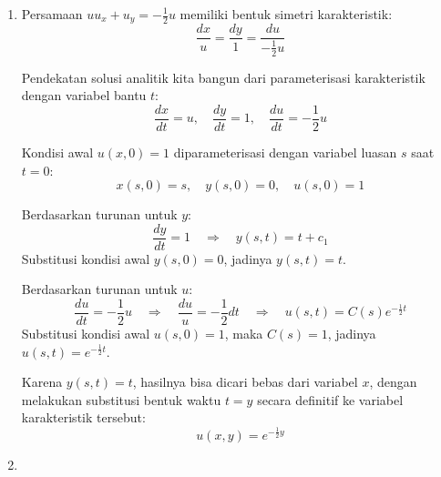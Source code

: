 \documentclass{article}
\theoremstyle{definition}
\begin{document}
\begin{enumerate}
        Dari persamaan \(\frac{dx}{y} = \frac{dy}{x}\), diperoleh:
        \[
          x\,dx - y\,dy = 0
          \quad \Rightarrow \quad
          \frac{1}{2}x^2 - \frac{1}{2}y^2 = c_1
          \quad \Rightarrow \quad
          x^2 - y^2 = C_1
        \]

        Dari persamaan \(\frac{dx}{y} = \frac{du}{xy}\), diperoleh:
        \[
          x\,dx = du
          \quad \Rightarrow \quad
          \int x\,dx = \int du
          \quad \Rightarrow \quad
          u - \frac{1}{2}x^2 = C_2
        \]

        Berdasarkan metode Lagrange, solusi umum dinyatakan dalam bentuk persamaan implisit \( F(C_1, C_2) = 0 \) atau \( C_2 = f(C_1) \). Sehingga:
        \[
          u - \frac{1}{2}x^2 = f(x^2 - y^2)
        \]

        Jadi, solusi umumnya adalah:
        \[
          u(x,y) = \frac{1}{2}x^2 + f(x^2 - y^2)
        \]
  \item Persamaan \(uu_x + u_y = -\frac{1}{2}u\) memiliki bentuk simetri karakteristik:
        \[
          \frac{dx}{u} = \frac{dy}{1} = \frac{du}{-\frac{1}{2}u}
        \]

        Pendekatan solusi analitik kita bangun dari parameterisasi karakteristik dengan variabel bantu \(t\):
        \[
          \frac{dx}{dt} = u, \quad \frac{dy}{dt} = 1, \quad \frac{du}{dt} = -\frac{1}{2}u
        \]

        Kondisi awal \( u(x,0) = 1 \) diparameterisasi dengan variabel luasan \( s \) saat \( t = 0 \):
        \[
          x(s,0) = s, \quad y(s,0) = 0, \quad u(s,0) = 1
        \]

        Berdasarkan turunan untuk \(y\):
        \[
          \frac{dy}{dt} = 1 \quad \Rightarrow \quad y(s,t) = t + c_1
        \]
        Substitusi kondisi awal \( y(s,0) = 0 \), jadinya \( y(s,t) = t \).

        Berdasarkan turunan untuk \(u\):
        \[
          \frac{du}{dt} = -\frac{1}{2}u \quad \Rightarrow \quad \frac{du}{u} = -\frac{1}{2}dt \quad \Rightarrow \quad u(s,t) = C(s) e^{-\frac{1}{2}t}
        \]
        Substitusi kondisi awal \( u(s,0) = 1 \), maka \( C(s)=1 \), jadinya \( u(s,t) = e^{-\frac{1}{2}t} \).

        Karena \( y(s,t) = t \), hasilnya bisa dicari bebas dari variabel $x$, dengan melakukan substitusi bentuk waktu \(t=y\) secara definitif ke variabel karakteristik tersebut:
        \[
          u(x,y) = e^{-\frac{1}{2}y}
        \]

  \item


\end{enumerate}
\end{document}

